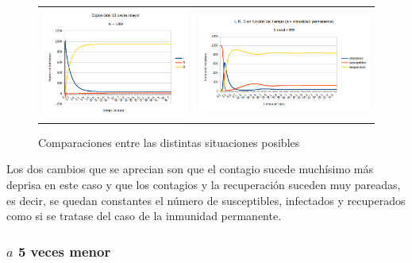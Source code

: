 \documentclass[11pt,a4paper]{report}
\begin{document}
\begin{figure}[H]
\begin{tabular}{ll}
\includegraphics[scale=0.25]{img/sin_inmunidad/exposicion_x10.png}
&
\includegraphics[scale=0.25]{img/sin_inmunidad/simulacion_ba_mayor.png}
\end{tabular}
\caption{Comparaciones entre las distintas situaciones posibles}
\end{figure}

Los dos cambios que se aprecian son que el contagio sucede muchísimo más deprisa en este caso y que los contagios y la recuperación suceden muy pareadas, es decir, se quedan constantes el número de susceptibles, infectados y recuperados como si se tratase del caso de la inmunidad permanente.

\subsubsection{$a$ 5 veces menor}
\end{document}
